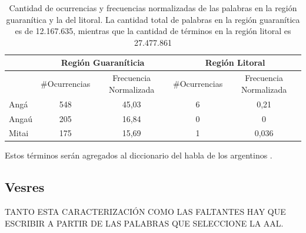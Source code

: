 \begin{table}[]
\centering
\label{tab:guaranismos}
\begin{tabular}{|l|cc|cc|}
\hline
 & \multicolumn{2}{c}{Región Guaraníticia} & \multicolumn{2}{c}{Región Litoral} \\ \hline
      & \#Ocurrencias & Frecuencia Normalizada & \#Ocurrencias & Frecuencia Normalizada \\
Angá  & 548              & 45,03       & 6             & 0,21                  \\
Angaú & 205               & 16,84   & 0               & 0                     \\
Mitai & 175              & 15,69      & 1              & 0,036    \\ \hline              
\end{tabular}
\caption{Cantidad de ocurrencias y frecuencias normalizadas de las palabras en la región guaranítica y la del litoral. La cantidad total de palabras en la región guaranítica es de 12.167.635, mientras que la cantidad de términos en la región litoral es 27.477.861 }

\end{table}

Estos términos serán agregados al diccionario del habla de los argentinos \cite{academia2008diccionario}.

\subsection{Vesres}
\label{sub:versres}
TANTO ESTA CARACTERIZACIÓN COMO LAS FALTANTES HAY QUE ESCRIBIR A PARTIR DE LAS PALABRAS QUE SELECCIONE LA AAL.